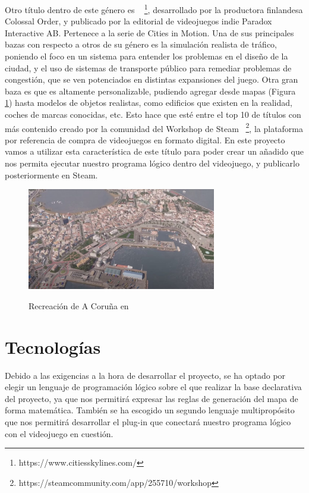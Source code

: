 Otro título dentro de este género es \cities~ \footnote{https://www.citiesskylines.com/}, desarrollado por la productora finlandesa Colossal Order, y publicado por la editorial de videojuegos indie Paradox Interactive AB. Pertenece a la serie de Cities in Motion\textcopyright. Una de sus principales bazas con respecto a otros de su género es la simulación realista de tráfico, poniendo el foco en un sistema para entender los problemas en el diseño de la ciudad, y el uso de sistemas de transporte público para remediar problemas de congestión, que se ven potenciados en distintas expansiones del juego. Otra gran baza es que es altamente personalizable, pudiendo agregar desde mapas (Figura \ref{fig:cities}) hasta modelos de objetos realistas, como edificios que existen en la realidad, coches de marcas conocidas, etc. Esto hace que esté entre el top 10 de títulos con más contenido creado por la comunidad del Workshop de Steam~ \footnote{https://steamcommunity.com/app/255710/workshop}, la plataforma por referencia de compra de videojuegos en formato digital. En este proyecto vamos a utilizar esta característica de este título para poder crear un añadido que nos permita ejecutar nuestro programa lógico dentro del videojuego, y publicarlo posteriormente en Steam.

\begin{figure}[h]
	\centering
	\includegraphics[height=12em]{images/CitiesCoruna}
	\label{fig:cities}
	\caption{Recreación de A Coruña en \cities}
\end{figure}

\section{Tecnologías}

Debido a las exigencias a la hora de desarrollar el proyecto, se ha optado por elegir un lenguaje de programación lógico sobre el que realizar la base declarativa del proyecto, ya que nos permitirá expresar las reglas de generación del mapa de forma matemática. También se ha escogido un segundo lenguaje multipropósito que nos permitirá desarrollar el plug-in que conectará nuestro programa lógico con el videojuego en cuestión.

